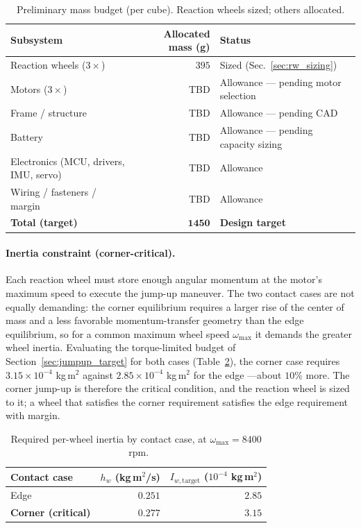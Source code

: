 \begin{table}[h]
\centering
\caption{Preliminary mass budget (per cube). Reaction wheels sized; others allocated.}
\label{tab:massbudget}
\small
\begin{tabular}{lrl}
\toprule
Subsystem & Allocated mass (g) & Status \\
\midrule
Reaction wheels ($3\times$)   & $395$  & Sized (Sec.~\ref{sec:rw_sizing}) \\
Motors ($3\times$)            & TBD    & Allowance --- pending motor selection \\
Frame / structure             & TBD    & Allowance --- pending CAD \\
Battery                       & TBD    & Allowance --- pending capacity sizing \\
Electronics (MCU, drivers, IMU, servo) & TBD & Allowance \\
Wiring / fasteners / margin   & TBD    & Allowance \\
\midrule
\textbf{Total (target)}       & $\mathbf{1450}$ & \textbf{Design target} \\
\bottomrule
\end{tabular}
\end{table}

\paragraph{Inertia constraint (corner-critical).} Each reaction wheel must store
enough angular momentum at the motor's maximum speed to execute the jump-up
maneuver. The two contact cases are not equally demanding: the corner
equilibrium requires a larger rise of the center of mass and a less favorable
momentum-transfer geometry than the edge equilibrium, so for a common maximum
wheel speed $\omega_{\max}$ it demands the greater wheel inertia. Evaluating the
torque-limited budget of Section~\ref{sec:jumpup_target} for both cases
(Table~\ref{tab:inertia_cases}), the corner case requires
$3.15\times10^{-4}$ kg\,m$^2$ against $2.85\times10^{-4}$ kg\,m$^2$ for the edge
---about $10\%$ more. The corner jump-up is therefore the critical condition,
and the reaction wheel is sized to it; a wheel that satisfies the corner
requirement satisfies the edge requirement with margin.

\begin{table}[h]
\centering
\caption{Required per-wheel inertia by contact case, at $\omega_{\max}=8400$~rpm.}
\label{tab:inertia_cases}
\begin{tabular}{lrr}
\toprule
Contact case & $h_w$ (kg\,m$^2$/s) & $I_{w,\text{target}}$ ($10^{-4}$ kg\,m$^2$) \\
\midrule
Edge                       & $0.251$ & $2.85$ \\
\textbf{Corner (critical)} & $\mathbf{0.277}$ & $\mathbf{3.15}$ \\
\bottomrule
\end{tabular}
\end{table}

